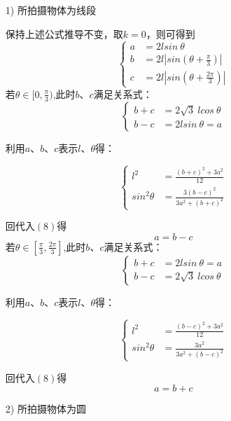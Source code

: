 \documentclass[a4paper,10.5pt]{ctexart}
\begin{document}
\begin{itemize}
  \item [1)] 所拍摄物体为线段    
\par 保持上述公式推导不变，取$k=0$，则可得到
\begin{equation}
\left\{
\begin{aligned}
a&=2lsin\ \theta\\
b&=2l|sin(\theta+\frac{\pi}{3})|\\
c&=2l|sin(\theta+\frac{2\pi}{3})|
\end{aligned}
\right.
\end{equation}
若$\theta\in[0,\frac{\pi}{3})$,此时$b$、$c$满足关系式：
\begin{equation}
\nonumber
\left\{
\begin{aligned}
b+c&=2\sqrt{3}\ lcos\ \theta\\
b-c&=2lsin\ \theta=a
\end{aligned}
\right.
\end{equation}
\par 利用$a$、$b$、$c$表示$l$、$\theta$得：

\begin{equation}
\nonumber
\left\{
\begin{aligned}
l^2&=\frac{(b+c)^2+3a^2}{12}\\
sin^2\theta&=\frac{3(b-c)^2}{3a^2+(b+c)^2}
\end{aligned}
\right.
\end{equation}
\par 回代入$(8)$得$$a=b-c$$
若$\theta\in[\frac{\pi}{3},\frac{2\pi}{3}]$,此时$b$、$c$满足关系式：
\begin{equation}
\nonumber
\left\{
\begin{aligned}
b+c&=2lsin\ \theta=a\\
b-c&=2\sqrt{3}\ lcos\ \theta
\end{aligned}
\right.
\end{equation}
\par 利用$a$、$b$、$c$表示$l$、$\theta$得：

\begin{equation}
\nonumber
\left\{
\begin{aligned}
l^2&=\frac{(b-c)^2+3a^2}{12}\\
sin^2\theta&=\frac{3a^2}{3a^2+(b-c)^2}
\end{aligned}
\right.
\end{equation}
\par 回代入$(8)$得$$a=b+c$$
  \item [2)] 所拍摄物体为圆
\end{itemize}
\end{document}
